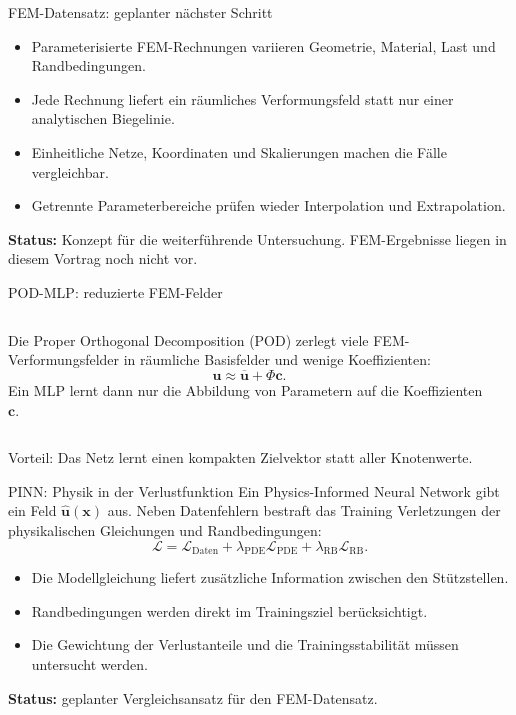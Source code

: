\documentclass[aspectratio=169,10pt]{beamer}
\begin{document}
\begin{frame}{FEM-Datensatz: geplanter nächster Schritt}
\begin{itemize}
\item Parameterisierte FEM-Rechnungen variieren Geometrie, Material, Last und Randbedingungen.
\item Jede Rechnung liefert ein räumliches Verformungsfeld statt nur einer analytischen Biegelinie.
\item Einheitliche Netze, Koordinaten und Skalierungen machen die Fälle vergleichbar.
\item Getrennte Parameterbereiche prüfen wieder Interpolation und Extrapolation.
\end{itemize}
\vfill\textbf{Status:} Konzept für die weiterführende Untersuchung. FEM-Ergebnisse liegen in diesem Vortrag noch nicht vor.
\end{frame}

\begin{frame}{POD-MLP: reduzierte FEM-Felder}
\begin{columns}[T]
Die Proper Orthogonal Decomposition (POD) zerlegt viele FEM-Verformungsfelder in räumliche Basisfelder und wenige Koeffizienten:
\[\boldsymbol{u}\approx\overline{\boldsymbol{u}}+\Phi\boldsymbol{c}.\]
Ein MLP lernt dann nur die Abbildung von Parametern auf die Koeffizienten $\boldsymbol{c}$.
\begin{center}\end{center}
\end{columns}
\vfill Vorteil: Das Netz lernt einen kompakten Zielvektor statt aller Knotenwerte.
\end{frame}

\begin{frame}{PINN: Physik in der Verlustfunktion}
Ein Physics-Informed Neural Network gibt ein Feld $\widehat{\boldsymbol{u}}(\boldsymbol{x})$ aus. Neben Datenfehlern bestraft das Training Verletzungen der physikalischen Gleichungen und Randbedingungen:
\[\mathcal{L}=\mathcal{L}_{\mathrm{Daten}}+\lambda_{\mathrm{PDE}}\mathcal{L}_{\mathrm{PDE}}+\lambda_{\mathrm{RB}}\mathcal{L}_{\mathrm{RB}}.\]
\begin{itemize}
\item Die Modellgleichung liefert zusätzliche Information zwischen den Stützstellen.
\item Randbedingungen werden direkt im Trainingsziel berücksichtigt.
\item Die Gewichtung der Verlustanteile und die Trainingsstabilität müssen untersucht werden.
\end{itemize}
\vfill\textbf{Status:} geplanter Vergleichsansatz für den FEM-Datensatz.
\end{frame}
\end{document}
